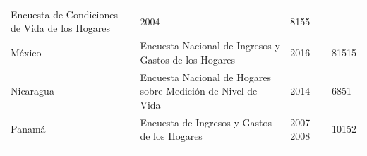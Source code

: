 \begin{longtable}[]{@{}llll@{}}
\begin{minipage}[t]{0.50\columnwidth}
Encuesta de Condiciones de Vida de los Hogares\strut
\end{minipage} & \begin{minipage}[t]{0.08\columnwidth}\raggedright
2004\strut
\end{minipage} & \begin{minipage}[t]{0.14\columnwidth}\raggedright
8155\strut
\end{minipage}\tabularnewline
\begin{minipage}[t]{0.17\columnwidth}\raggedright
México\strut
\end{minipage} & \begin{minipage}[t]{0.50\columnwidth}\raggedright
Encuesta Nacional de Ingresos y Gastos de los Hogares\strut
\end{minipage} & \begin{minipage}[t]{0.08\columnwidth}\raggedright
2016\strut
\end{minipage} & \begin{minipage}[t]{0.14\columnwidth}\raggedright
81515\strut
\end{minipage}\tabularnewline
\begin{minipage}[t]{0.17\columnwidth}\raggedright
Nicaragua\strut
\end{minipage} & \begin{minipage}[t]{0.50\columnwidth}\raggedright
Encuesta Nacional de Hogares sobre Medición de Nivel de Vida\strut
\end{minipage} & \begin{minipage}[t]{0.08\columnwidth}\raggedright
2014\strut
\end{minipage} & \begin{minipage}[t]{0.14\columnwidth}\raggedright
6851\strut
\end{minipage}\tabularnewline
\begin{minipage}[t]{0.17\columnwidth}\raggedright
Panamá\strut
\end{minipage} & \begin{minipage}[t]{0.50\columnwidth}\raggedright
Encuesta de Ingresos y Gastos de los Hogares\strut
\end{minipage} & \begin{minipage}[t]{0.08\columnwidth}\raggedright
2007-2008\strut
\end{minipage} & \begin{minipage}[t]{0.14\columnwidth}\raggedright
10152\strut
\end{minipage}\tabularnewline
\begin{minipage}[t]{0.17\columnwidth}\raggedright

\end{minipage}
\end{longtable}
